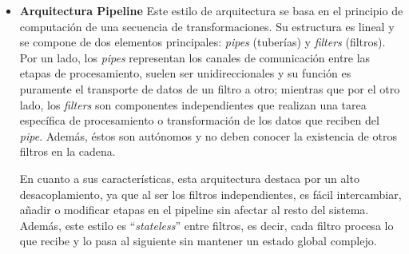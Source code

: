 \begin{itemize}
    \begin{itemize}
        \item Costo y simplicidad: es una arquitectura muy fácil de entender y barata de implementar inicialmente.
        \item Facilidad de desarrollo: al ser un estándar tan conocido, los equipos pueden empezar a trabajar rápidamente.
        \item Escalabilidad y Elasticidad: esta características es, quizás, su mayor debilidad y esto ocurre porque al ser
        monolítica, no va a permitir un escalado de las partes específicas del sistema de forma independiente.
        \item Tolerancia a fallos: esta es otra debilidad que presenta, ya que si se produce un fallo en una de las capas
        (por ejemplo, base de datos), el fallo va a afectar a toda la aplicación.
    \end{itemize}

    Como conclusión, se puede destacar que esta arquitectura es ideal para aplicaciones pequeñas y sencillas donde el 
    presupuesto es limitado y la complejidad no justifica sistemas distribuidos más costosos.

    \item \textbf{Arquitectura Pipeline}
    \newline
    Este estilo de arquitectura se basa en el principio de computación de una secuencia de transformaciones. Su estructura
    es lineal y se compone de dos elementos principales: \textit{pipes} (tuberías) y \textit{filters} (filtros). Por un lado,
    los \textit{pipes} representan los canales de comunicación entre las etapas de procesamiento, suelen ser unidireccionales 
    y su función es puramente el transporte de datos de un filtro a otro; mientras que por el otro lado, los \textit{filters}
    son componentes independientes que realizan una tarea específica de procesamiento o transformación de los datos que reciben 
    del \textit{pipe}. Además, éstos son autónomos y no deben conocer la existencia de otros filtros en la cadena.

    En cuanto a sus características, esta arquitectura destaca por un alto desacoplamiento, ya que al ser los filtros
    independientes, es fácil intercambiar, añadir o modificar etapas en el pipeline sin afectar al resto del sistema. 
    Además, este estilo es ``\textit{stateless}'' entre filtros, es decir, cada filtro procesa lo que recibe y lo pasa 
    al siguiente sin mantener un estado global complejo.


\end{itemize}
